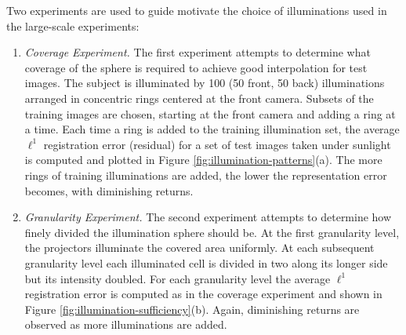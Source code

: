 Two experiments are used to guide motivate the choice of illuminations 
used in the large-scale experiments:
\begin{enumerate}
\item {\em Coverage Experiment.} The first experiment 
    attempts to determine what coverage of the sphere is
    required to achieve good interpolation for test images.
    The subject is illuminated by 100 (50 front, 50 back)
    illuminations arranged in concentric rings centered at
    the front camera.  Subsets of the training images are
    chosen, starting at the front camera and adding a ring
    at a time.  Each time a ring is added to the training
    illumination set, the average $\ell^1$ registration
    error (residual) for a set of test images taken under
    sunlight is computed and plotted in Figure
    \ref{fig:illumination-patterns}(a).  The more rings of
    training illuminations are added, the lower the
    representation error becomes, with diminishing returns.
\item {\em Granularity Experiment.} The second
    experiment attempts to determine how finely divided
    the illumination sphere should be.  At the first
    granularity level, the projectors  illuminate the
    covered area uniformly.  At each subsequent granularity
    level each illuminated cell is divided in two along its
    longer side but its intensity doubled.  For each
    granularity level the average $\ell^1$ registration
    error is computed as in the coverage experiment and
    shown in Figure \ref{fig:illumination-sufficiency}(b).
    Again, diminishing returns are observed as more
    illuminations are added.
\end{enumerate}
